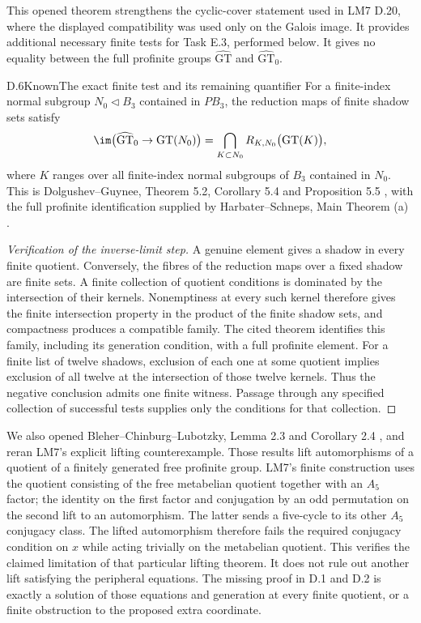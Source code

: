 This opened theorem strengthens the cyclic-cover statement used in
LM7 D.20, where the displayed compatibility was used only on the
Galois image. It provides additional necessary finite tests for Task
E.3, performed below. It gives no equality between the full profinite
groups $\widehat{\mathrm{GT}}$ and $\widehat{\mathrm{GT}}_0$.

\begin{statement}{D.6}{Known}{The exact finite test and its remaining quantifier}
For a finite-index normal subgroup $N_0\triangleleft B_3$ contained in
$PB_3$, the reduction maps of finite shadow sets satisfy
\[
 \im\bigl(\widehat{\mathrm{GT}}_0\to\mathrm{GT}(N_0)\bigr)
 =\bigcap_{K\subset N_0}
 R_{K,N_0}\bigl(\mathrm{GT}(K)\bigr),
\]
where $K$ ranges over all finite-index normal subgroups of $B_3$
contained in $N_0$. This is Dolgushev--Guynee, Theorem 5.2,
Corollary 5.4 and Proposition 5.5 \cite{DE_DolgushevGuynee2024},
with the full profinite identification supplied by Harbater--Schneps,
Main Theorem (a) \cite{DE_HarbaterSchneps2000}.
\end{statement}
\begin{proof}[Verification of the inverse-limit step]
A genuine element gives a shadow in every finite quotient. Conversely,
the fibres of the reduction maps over a fixed shadow are finite sets.
A finite collection of quotient conditions is dominated by the
intersection of their kernels. Nonemptiness at every such kernel
therefore gives the finite intersection property in the product of the
finite shadow sets, and compactness produces a compatible family.
The cited theorem identifies this family, including its generation
condition, with a full profinite element. For a finite list of twelve
shadows, exclusion of each one at some quotient implies exclusion of
all twelve at the intersection of those twelve kernels. Thus the
negative conclusion admits one finite witness. Passage through any
specified collection of successful tests supplies only the conditions
for that collection.
\end{proof}

We also opened Bleher--Chinburg--Lubotzky, Lemma 2.3 and Corollary 2.4
\cite{DE_BCL2020}, and reran LM7's explicit lifting counterexample.
Those results lift automorphisms of a quotient of a finitely generated
free profinite group. LM7's finite construction uses the quotient
consisting of the free metabelian quotient together with an $A_5$
factor; the identity on the first factor and conjugation by an odd
permutation on the second lift to an automorphism. The latter sends a
five-cycle to its other $A_5$ conjugacy class. The lifted automorphism
therefore fails the required conjugacy condition on $x$ while acting
trivially on the metabelian quotient. This verifies the claimed
limitation of that particular lifting theorem. It does not rule out
another lift satisfying the peripheral equations. The missing proof
in D.1 and D.2 is exactly a solution of those equations and generation
at every finite quotient, or a finite obstruction to the proposed
extra coordinate.


